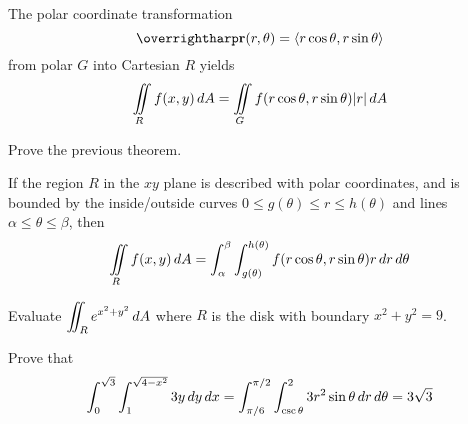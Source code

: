 \documentclass[letterpaper, twoside, 12pt]{book}
\begin{document}
\begin{theorem}
  The polar coordinate transformation
  \[
    \vect{r}(r,\theta)
      =
    \<r\cos\theta, r\sin\theta\>
  \]
  from polar $G$ into Cartesian $R$ yields
  \[
    \iint\limits_R f(x,y)\,d{A}
      =
    \iint\limits_G f(r\cos\theta,r\sin\theta)|r|\,d{A}
  \]
\end{theorem}

          \begin{problem}
            Prove the previous theorem.
          \end{problem}

          \begin{solution}

          \end{solution}

          \begin{contributors}

          \end{contributors}

\begin{theorem}
  If the region $R$ in the $xy$ plane is described with polar coordinates,
  and is bounded by the inside/outside curves
  $0\leq g(\theta)\leq r\leq h(\theta)$
  and lines $\alpha\leq\theta\leq\beta$, then
    \[
      \iint\limits_R f(x,y)\,d{A}
        =
      \int_\alpha^\beta\int_{g(\theta)}^{h(\theta)}
      f(r\cos\theta,r\sin\theta) r\,d{r}\,d{\theta}
    \]
\end{theorem}

          \begin{problem}
            Evaluate $\displaystyle\iint_R e^{x^2+y^2}\,d{A}$ where $R$ is the
            disk with boundary $x^2+y^2=9$.
          \end{problem}

          \begin{solution}

          \end{solution}

          \begin{contributors}

          \end{contributors}

          \begin{problem}
            Prove that
            \[
              \int_{0}^{\sqrt{3}}\int_{1}^{\sqrt{4-x^2}} 3y\,d{y}\,d{x}
                =
              \int_{\pi/6}^{\pi/2}\int_{\csc\theta}^2
              3r^2\sin\theta\,d{r}\,d{\theta}
                =
              3\sqrt{3}
            \]
          \end{problem}
\end{document}

